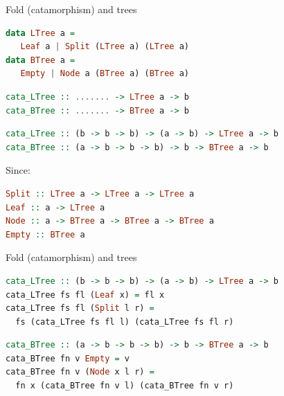 \documentclass[lualatex]{beamer}
\renewcommand{\_}{\textscale{.6}{\textunderscore}}
\begin{document}
\begin{frame}[fragile]{Fold (catamorphism) and trees}
\begin{lstlisting}[language=Haskell]
data LTree a = 
   Leaf a | Split (LTree a) (LTree a)
data BTree a = 
   Empty | Node a (BTree a) (BTree a)
\end{lstlisting}
\pause

\begin{lstlisting}[language=Haskell, morekeywords={cata_LTree, cata_BTree}]
cata_LTree :: ....... -> LTree a -> b
cata_BTree :: ....... -> BTree a -> b
\end{lstlisting}
\pause

\begin{lstlisting}[language=Haskell, morekeywords={cata_LTree, cata_BTree}]
cata_LTree :: (b -> b -> b) -> (a -> b) -> LTree a -> b
cata_BTree :: (a -> b -> b -> b) -> b -> BTree a -> b
\end{lstlisting}

Since:

\begin{lstlisting}[language=Haskell]
Split :: LTree a -> LTree a -> LTree a
Leaf :: a -> LTree a
Node :: a -> BTree a -> BTree a -> BTree a
Empty :: BTree a
\end{lstlisting}
\end{frame}

\begin{frame}[fragile]{Fold (catamorphism) and trees}
\begin{lstlisting}[language=Haskell, morekeywords={cata_LTree}]
cata_LTree :: (b -> b -> b) -> (a -> b) -> LTree a -> b
cata_LTree fs fl (Leaf x) = fl x
cata_LTree fs fl (Split l r) = 
  fs (cata_LTree fs fl l) (cata_LTree fs fl r)
\end{lstlisting}

\begin{lstlisting}[language=Haskell, morekeywords={cata_BTree}]
cata_BTree :: (a -> b -> b -> b) -> b -> BTree a -> b
cata_BTree fn v Empty = v
cata_BTree fn v (Node x l r) = 
  fn x (cata_BTree fn v l) (cata_BTree fn v r)
\end{lstlisting}

\end{frame}

\end{document}
